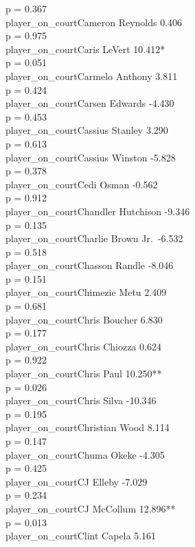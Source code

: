 \documentclass[
  landscape]{article}
\begin{document}
p = 0.367\\
player\_on\_courtCameron Reynolds 0.406\\
p = 0.975\\
player\_on\_courtCaris LeVert 10.412*\\
p = 0.051\\
player\_on\_courtCarmelo Anthony 3.811\\
p = 0.424\\
player\_on\_courtCarsen Edwards -4.430\\
p = 0.453\\
player\_on\_courtCassius Stanley 3.290\\
p = 0.613\\
player\_on\_courtCassius Winston -5.828\\
p = 0.378\\
player\_on\_courtCedi Osman -0.562\\
p = 0.912\\
player\_on\_courtChandler Hutchison -9.346\\
p = 0.135\\
player\_on\_courtCharlie Brown Jr.~-6.532\\
p = 0.518\\
player\_on\_courtChasson Randle -8.046\\
p = 0.151\\
player\_on\_courtChimezie Metu 2.409\\
p = 0.681\\
player\_on\_courtChris Boucher 6.830\\
p = 0.177\\
player\_on\_courtChris Chiozza 0.624\\
p = 0.922\\
player\_on\_courtChris Paul 10.250**\\
p = 0.026\\
player\_on\_courtChris Silva -10.346\\
p = 0.195\\
player\_on\_courtChristian Wood 8.114\\
p = 0.147\\
player\_on\_courtChuma Okeke -4.305\\
p = 0.425\\
player\_on\_courtCJ Elleby -7.029\\
p = 0.234\\
player\_on\_courtCJ McCollum 12.896**\\
p = 0.013\\
player\_on\_courtClint Capela 5.161\\
\end{document}
